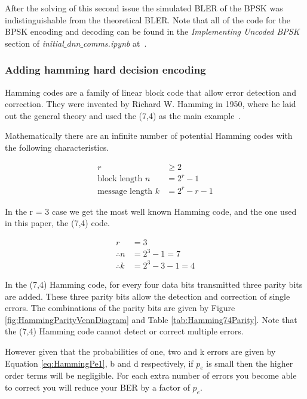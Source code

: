 \documentclass[12pt,onecolumn,letterpaper]{article}
\newcommand{\code}{\textit}
\begin{document}
After the solving of this second issue the simulated BLER of the BPSK was indistinguishable from the theoretical BLER. Note that all of the code for the BPSK encoding and decoding can be found in the \textit{Implementing Uncoded BPSK} section of \code{initial$\_$dnn$\_$comms.ipynb} at~\cite{AwGithub}.

\subsubsection{Adding hamming hard decision encoding}

Hamming codes are a family of linear block code that allow error detection and correction. They were invented by Richard W. Hamming in 1950, where he laid out the general theory and used the (7,4) as the main example~\cite{HammingOriginalPaper}.

Mathematically there are an infinite number of potential Hamming codes with the following characteristics.

\begin{align}
   r &\geq 2 \\
   \mbox{block length } n &= 2^r - 1 \\
   \mbox{message length } k &= 2^r -r -1
   \label{eq:GeneralHamming}
\end{align}

In the r = 3 case we get the most well known Hamming code, and the one used in this paper, the (7,4) code.

\begin{align}
   r &= 3 \\
   \therefore n &= 2^3 - 1 = 7 \\
   \therefore k &= 2^3 -3 -1 = 4
   \label{eq:Hamming74Characteristics}
\end{align}

In the (7,4) Hamming code, for every four data bits transmitted three parity bits are added. These three parity bits allow the detection and correction of single errors. The combinations of the parity bits are given by Figure \ref{fig:HammingParityVennDiagram} and Table \ref{tab:Hamming74Parity}. Note that the (7,4) Hamming code cannot detect or correct multiple errors. 

However given that the probabilities of one, two and k errors are given by Equation \ref{eq:HammingPe1}, b and d respectively, if $p_e$ is small then the higher order terms will be negligible. For each extra number of errors you become able to correct you will reduce your BER by a factor of $p_e$.
\end{document}
